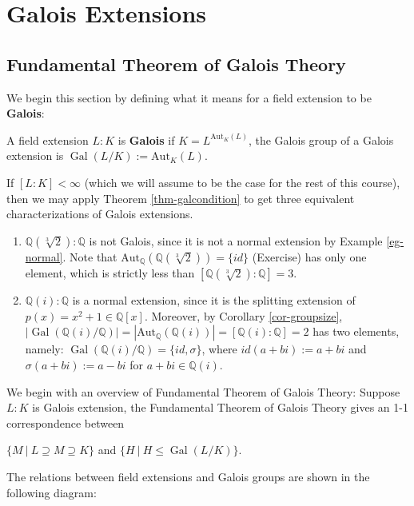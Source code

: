 \chapter{Galois Extensions}
\section{Fundamental Theorem of Galois Theory}
We begin this section by defining what it means for a field extension to be {\bf Galois}:
\begin{definition}
    A field extension $L:K$ is {\bf Galois} if $K=L^{\mathrm{Aut}_K(L)}$, the Galois group of a Galois extension is $\operatorname{Gal}(L/K):=\mathrm{Aut}_K(L)$.

    If $[L:K] < \infty$ (which we will assume to be the case for the rest of this course), then we may apply Theorem \ref{thm-galcondition} to get three equivalent characterizations of Galois extensions.
\end{definition}
\begin{example}
    \begin{enumerate}
        \item $\mathbb{Q}(\sqrt[3]{2}):\mathbb{Q}$ is not Galois, since it is not a normal extension by Example \ref{eg-normal}. Note that $\mathrm{Aut}_{\mathbb{Q}}(\mathbb{Q}(\sqrt[3]{2})) = \{id\}$ (Exercise) has only one element, which is strictly less than $[\mathbb{Q}(\sqrt[3]{2}):\mathbb{Q}] = 3$.
        \item  $\mathbb{Q}(i):\mathbb{Q}$ is a normal extension, since it is the splitting extension of $p(x) = x^2+1 \in \mathbb{Q}[x]$. Moreover, by Corollary \ref{cor-groupsize}, $|\operatorname{Gal}(\mathbb{Q}(i)/\mathbb{Q})| = |\mathrm{Aut}_{\mathbb{Q}}(\mathbb{Q}(i))| = [\mathbb{Q}(i):\mathbb{Q}] = 2$ has two elements, namely:
        $\operatorname{Gal}(\mathbb{Q}(i)/\mathbb{Q}) = \{id, \sigma\}$, where $id(a+bi):=a+bi$ and $\sigma(a+bi):=a-bi$ for $a+bi \in \mathbb{Q}(i)$.
    \end{enumerate}
\end{example}

We begin with an overview of Fundamental Theorem of Galois Theory: 
Suppose $L : K$ is Galois extension, the Fundamental Theorem of Galois Theory gives an 1-1 correspondence between 
\begin{center}
    $\{M\ |\ L \supseteq M \supseteq K\}$ and $\{H\ |\ H\leq \operatorname{Gal}(L /K)\}$. 
\end{center}
The relations between field extensions and Galois groups are shown in the following diagram: 

